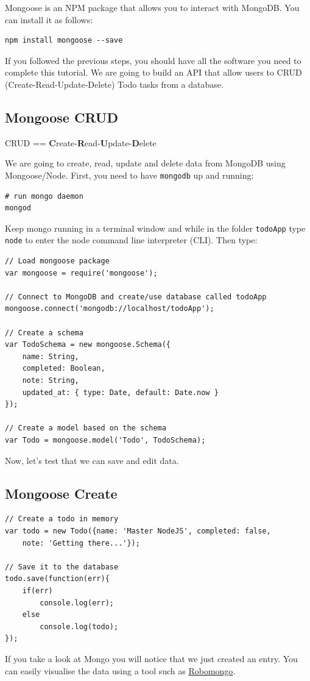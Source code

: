 \documentclass[12pt]{article}
\begin{document}
Mongoose is an NPM package that allows you to interact with MongoDB. You
can install it as follows:
\begin{Verbatim}
npm install mongoose --save
\end{Verbatim}
If you followed the previous steps, you should have all the software you need to
complete this tutorial. We are going to build an API that allow users to
CRUD (Create-Read-Update-Delete) Todo tasks from a database.

\subsection{Mongoose CRUD}

CRUD == \textbf{C}reate-\textbf{R}ead-\textbf{U}pdate-\textbf{D}elete

We are going to create, read, update and delete data from MongoDB using
Mongoose/Node. First, you need to have \verb!mongodb! up and running:
\begin{Verbatim}
# run mongo daemon
mongod
\end{Verbatim}
Keep mongo running in a terminal window and while in the folder
\texttt{todoApp} type \texttt{node} to enter the node command line interpreter (CLI). Then type:
\begin{Verbatim}
// Load mongoose package
var mongoose = require('mongoose');

// Connect to MongoDB and create/use database called todoApp
mongoose.connect('mongodb://localhost/todoApp');

// Create a schema
var TodoSchema = new mongoose.Schema({  
	name: String,  
	completed: Boolean,  
	note: String,  
	updated_at: { type: Date, default: Date.now }
});

// Create a model based on the schema
var Todo = mongoose.model('Todo', TodoSchema);
\end{Verbatim}
Now, let's test that we can save and edit data.

\subsection{Mongoose Create}

\begin{Verbatim}
// Create a todo in memory
var todo = new Todo({name: 'Master NodeJS', completed: false, 
	note: 'Getting there...'});

// Save it to the database
todo.save(function(err){  
	if(err)    
		console.log(err);  
	else    
		console.log(todo);
});
\end{Verbatim}
If you take a look at Mongo you will notice that we just created an
entry. You can easily visualise the data using a tool such as 
\href{https://robomongo.org/}{Robomongo}.
\end{document}
